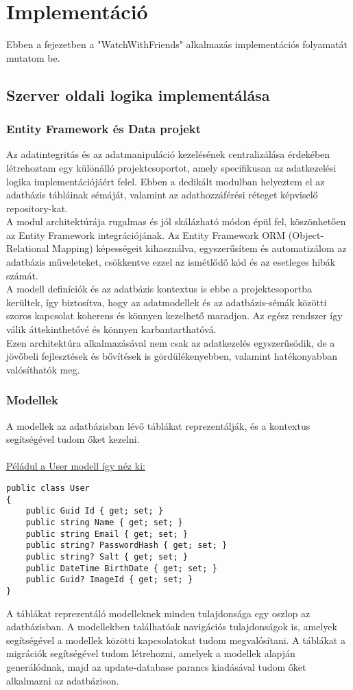 \chapter{Implement\'aci\'o}\label{chapter:implementation}
Ebben a fejezetben a "WatchWithFriends" alkalmazás implementációs folyamatát mutatom be.
\section*{Szerver oldali logika implementálása}
\subsection*{Entity Framework és Data projekt}
Az adatintegritás és az adatmanipuláció kezelésének centralizálása érdekében létrehoztam egy különálló projektcsoportot, amely specifikusan az adatkezelési logika implementációjáért felel. Ebben a dedikált modulban helyeztem el az adatbázis tábláinak sémáját, valamint az adathozzáférési réteget képviselő repository-kat.
\\
A modul architektúrája rugalmas és jól skálázható módon épül fel, köszönhetően az Entity Framework integrációjának. Az Entity Framework ORM (Object-Relational Mapping) képességeit kihasználva, egyszerűsítem és automatizálom az adatbázis műveleteket, csökkentve ezzel az ismétlődő kód és az esetleges hibák számát.
\\
A modell definíciók és az adatbázis kontextus is ebbe a projektcsoportba kerültek, így biztosítva, hogy az adatmodellek és az adatbázis-sémák közötti szoros kapcsolat koherens és könnyen kezelhető maradjon. Az egész rendszer így válik áttekinthetővé és könnyen karbantarthatóvá.
\\
Ezen architektúra alkalmazásával nem csak az adatkezelés egyszerűsödik, de a jövőbeli fejlesztések és bővítések is gördülékenyebben, valamint hatékonyabban valósíthatók meg.
\subsection*{Modellek}
A modellek az adatbázisban lévő táblákat reprezentálják, és a kontextus segítségével tudom őket kezelni.
\\
\\
\underline{Péládul a User modell így néz ki:}
\begin{lstlisting}[language=CSharp,style=CSharpBase]
public class User
{
    public Guid Id { get; set; }
    public string Name { get; set; }
    public string Email { get; set; }
    public string? PasswordHash { get; set; }
    public string? Salt { get; set; }
    public DateTime BirthDate { get; set; }
    public Guid? ImageId { get; set; }
}
\end{lstlisting}
A táblákat reprezentáló modelleknek minden tulajdonsága egy oszlop az adatbázisban.
A modellekben találhatóak navigációs tulajdonságok is, amelyek segítségével a modellek közötti kapcsolatokat tudom megvalósítani.
A táblákat a migrációk segítségével tudom létrehozni, amelyek a modellek alapján generálódnak, majd az update-database parancs kiadásával tudom őket alkalmazni az adatbázison.

